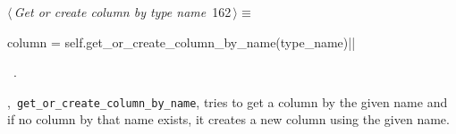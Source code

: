 \documentclass[%
    a4paper,    %
    justified,  %
    nobib,      %
    openany     %
]{tufte-book}
\makeatletter
\renewcommand{\label}[1]{\@tufte@label{##1}}%
\makeatother
\begin{document}
\begin{flushleft} \small
\begin{minipage}{\linewidth}\label{scrap156}\raggedright\small
{} $\langle\,${\itshape Get or create column by type name}\nobreak\ {\footnotesize {162}}$\,\rangle\equiv$
\vspace{-1ex}
\begin{pythoncode}
    column = self.get_or_create_column_by_name(type_name)|\NWsep|
\end{pythoncode}
\vspace{1.5ex}
\footnotesize
\begin{list}{}{\setlength{\itemsep}{-\parsep}\setlength{\itemindent}{-\leftmargin}}
\item \NWtxtMacroRefIn\ .

\item{}
\end{list}
\end{minipage}\vspace{4ex}
\end{flushleft}
,~\verb=get_or_create_column_by_name=,
tries to get a column by the given name and if no column by that name exists, it
creates a new column using the given name.
\end{document}
